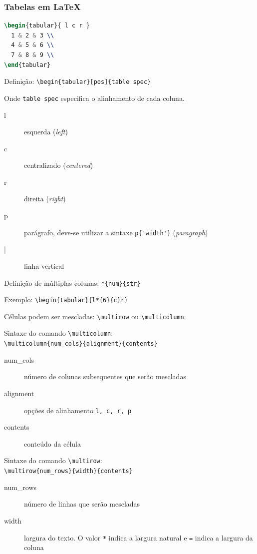 \begin{frame}
\frametitle{Tabelas em \LaTeX{}}
\begin{lstlisting}[language=tex, label=lst-tabela, caption={Exemplo de documento em \LaTeX{}}, postbreak=\mbox{$\hookrightarrow$\space}, basicstyle=\fontsize{8}{10}\selectfont\ttfamily]
\begin{tabular}{ l c r }
  1 & 2 & 3 \\
  4 & 5 & 6 \\
  7 & 8 & 9 \\
\end{tabular}
\end{lstlisting}

Definição: \verb|\begin{tabular}[pos]{table spec}|

Onde \texttt{table spec} especifica o alinhamento de cada coluna.

\begin{description}
\item[l] esquerda (\emph{left})
\item[c] centralizado (\emph{centered})
\item[r] direita (\emph{right})
\item[p] parágrafo, deve-se utilizar a sintaxe \verb|p{'width'}| (\emph{paragraph}) 
\item[|] linha vertical
\end{description}

\vspace{3ex}
Definição de múltiplas colunas: \verb|*{num}{str}|

Exemplo: \verb|\begin{tabular}{l*{6}{c}r}|

\framebreak

\vspace{3ex}
Células podem ser mescladas: \verb|\multirow| ou \verb|\multicolumn|.


Sintaxe do comando \verb|\multicolumn|: \\
\verb|\multicolumn{num_cols}{alignment}{contents}|

\begin{description}
\item[num\_cols] número de colunas subsequentes que serão mescladas
\item[alignment] opções de alinhamento \texttt{l, c, r, p}
\item[contents] conteúdo da célula
\end{description}

\framebreak

Sintaxe do comando \verb|\multirow|: \\
\verb|\multirow{num_rows}{width}{contents}|

\begin{description}
\item[num\_rows] número de linhas que serão mescladas
\item[width] largura do texto. O valor \texttt{*} indica a largura natural e \texttt{=} indica a largura da coluna
\end{description}

\end{frame}


